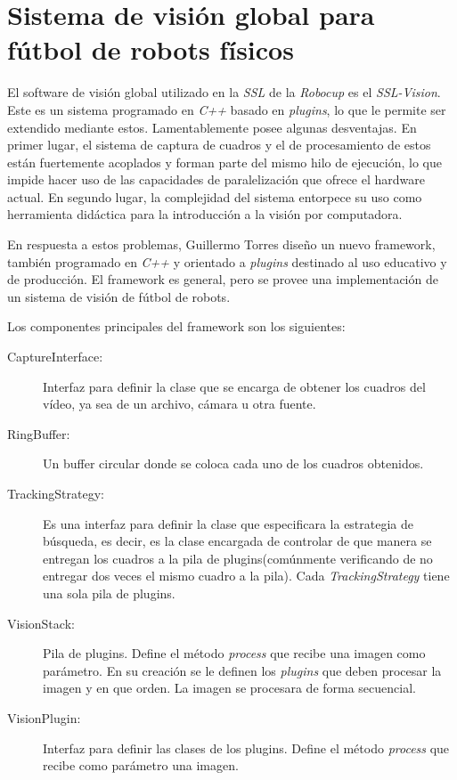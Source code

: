 
\section{Sistema de visión global para fútbol de robots físicos}

El software de visión global utilizado en la \emph{SSL} de la \emph{Robocup} es
el \emph{SSL-Vision}. Este es un sistema programado en \emph{C++} basado en
\emph{plugins}, lo que le permite ser extendido mediante estos. Lamentablemente
posee algunas desventajas. En primer lugar, el sistema de captura de cuadros y
el de procesamiento de estos están fuertemente acoplados y forman parte del
mismo hilo de ejecución, lo que impide hacer uso de las capacidades de
paralelización que ofrece el hardware actual. En segundo lugar, la complejidad
del sistema entorpece su uso como herramienta didáctica para la introducción a
la visión por computadora.

En respuesta a estos problemas, Guillermo Torres\cite{torres2014} diseño un
nuevo framework, también programado en \emph{C++} y orientado a \emph{plugins}
destinado al uso educativo y de producción. El framework es general, pero se
provee una implementación de un sistema de visión de fútbol de robots.

Los componentes principales del framework son los siguientes:

\begin{description}

	\item[CaptureInterface:] Interfaz para definir la clase que se
		encarga de obtener los cuadros del vídeo, ya sea de un archivo,
		cámara u otra fuente.

	\item[RingBuffer:] Un buffer circular donde se coloca cada uno de los
		cuadros obtenidos.

	\item[TrackingStrategy:] Es una interfaz para definir la clase que
		especificara la estrategia de búsqueda, es decir, es la clase
		encargada de controlar de que manera se entregan los cuadros a
		la pila de plugins(comúnmente verificando de no entregar dos
		veces el mismo cuadro a la pila). Cada \emph{TrackingStrategy}
		tiene una sola pila de plugins.
	
	\item[VisionStack:] Pila de plugins. Define el método \emph{process} que
		recibe una imagen como parámetro. En su creación se le definen
		los \emph{plugins} que deben procesar la imagen y en que orden.
		La imagen se procesara de forma secuencial.

	\item[VisionPlugin:] Interfaz para definir las clases de los plugins.
		Define el método \emph{process} que recibe como parámetro una
		imagen.

\end{description}

